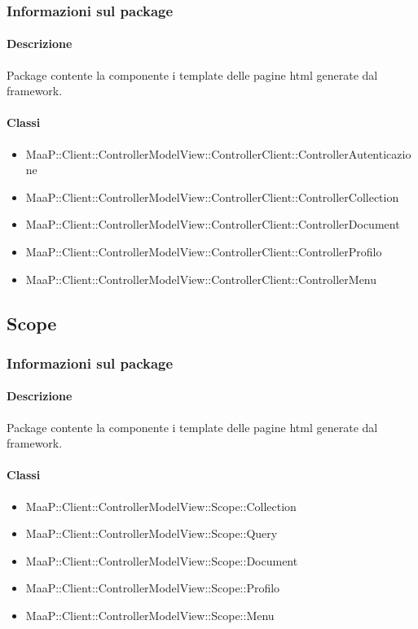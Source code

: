 \subsubsection{Informazioni sul package}
\paragraph{Descrizione}
Package contente la componente i template delle pagine html generate dal framework.

\paragraph{Classi}
\begin{itemize}
\item MaaP::Client::ControllerModelView::ControllerClient::ControllerAutenticazione
\item MaaP::Client::ControllerModelView::ControllerClient::ControllerCollection
\item MaaP::Client::ControllerModelView::ControllerClient::ControllerDocument
\item MaaP::Client::ControllerModelView::ControllerClient::ControllerProfilo
\item MaaP::Client::ControllerModelView::ControllerClient::ControllerMenu
\end{itemize}


\subsection{Scope}
\subsubsection{Informazioni sul package}
\paragraph{Descrizione}
Package contente la componente i template delle pagine html generate dal framework.

\paragraph{Classi}
\begin{itemize}
\item MaaP::Client::ControllerModelView::Scope::Collection
\item MaaP::Client::ControllerModelView::Scope::Query
\item MaaP::Client::ControllerModelView::Scope::Document
\item MaaP::Client::ControllerModelView::Scope::Profilo
\item MaaP::Client::ControllerModelView::Scope::Menu
\end{itemize}


